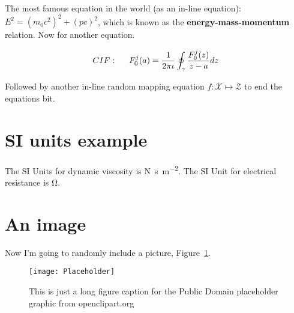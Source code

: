 The most famous equation in the world (as an in-line equation): $E^2 = (m_0c^2)^2 + (pc)^2$, which is known as the \textbf{energy-mass-momentum} relation. Now for another equation.

\begin{align}
CIF: \hspace*{5mm}F_0^j(a) = \frac{1}{2\pi \iota} \oint_{\gamma} \frac{F_0^j(z)}{z - a} dz
\end{align}

Followed by another in-line random mapping equation $f:\mathcal{X}\mapsto\mathcal{Z}$ to end the equations bit.

\nomenclature[g-p]{$\pi$}{ $\simeq 3.14\ldots$}                         %

\section{SI units example}
The SI Units for dynamic viscosity is \si{\newton\second\per\metre\squared}. The SI Unit for electrical resistance is \si{\ohm}.

\section{An image}

Now I'm going to randomly include a picture, Figure~\ref{fig:placeholder}.

\begin{figure}[htbp!] 
\centering    
\texttt{[image: Placeholder]}
\caption[Placeholder]{This is just a long figure caption for the Public Domain placeholder graphic from openclipart.org}
\label{fig:placeholder}
\end{figure}

